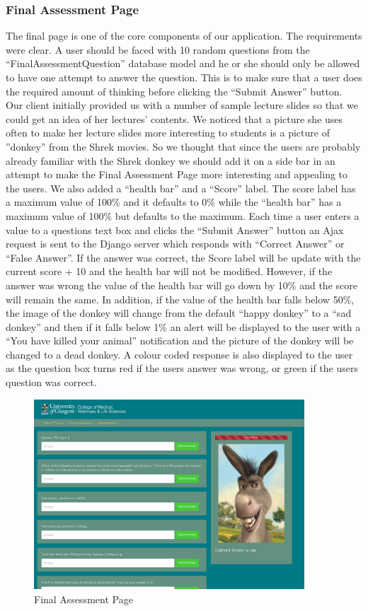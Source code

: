 \documentclass{l3proj}
\begin{document}
\subsubsection{Final Assessment Page}
The final page is one of the core components of our application. The
requirements were clear. A user should be faced with 10 random
questions from the “FinalAssessmentQuestion” database model and he or
she should only be allowed to have one attempt to answer the
question. This is to make sure that a user does the required amount of
thinking before clicking the “Submit Answer” button. Our client
initially provided us with a number of sample lecture slides so that
we could get an idea of her lectures’ contents. We noticed that a
picture she uses often to make her lecture slides more interesting to
students is a picture of ''donkey'' from the Shrek movies. So we
thought that since the users are probably already familiar with the
Shrek donkey  we should add it on a side bar in an attempt to make the Final Assessment Page more interesting and appealing to the users. We also added a “health bar” and a “Score” label. The score label has a maximum value of 100\% and it defaults to 0\% while the “health bar” has a maximum value of 100\% but defaults to the maximum. Each time a user enters a value to a questions text box and clicks the “Submit Answer” button an Ajax request is sent to the Django server which responds with “Correct Answer” or “False Answer”. If the answer was correct, the Score label will be update with the current score + 10 and the health bar will not be modified. However, if the answer was wrong the value of the health bar will go down by 10\% and the score will remain the same.  In addition, if the value of the health bar falls below 50\%, the image of the donkey will change from the default “happy donkey” to a “sad donkey” and then if it falls below 1\% an alert will be displayed to the user with a “You have killed your animal” notification and the picture of the donkey will be changed to a dead donkey.  A colour coded response is also displayed to the user as the question box turns red if the users answer was wrong, or green if the users question was correct. 
\begin{figure}[!htb]
\caption{Final Assessment Page}
 \centering
\includegraphics[width=0.9\textwidth]{images/finalAssessmentPage.png}
\end{figure}
\end{document}
